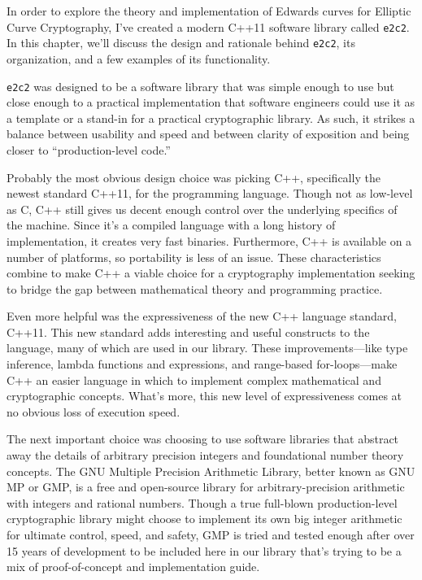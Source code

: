 \label{chp:e2c2}

In order to explore the theory and implementation of Edwards curves for
    Elliptic Curve Cryptography, I've created a modern C++11 software library
    called \texttt{e2c2}.
In this chapter, we'll discuss the design and rationale behind \texttt{e2c2},
    its organization, and a few examples of its functionality.



\texttt{e2c2} was designed to be a software library that was simple enough to
    use but close enough to a practical implementation that software engineers
    could use it as a template or a stand-in for a practical cryptographic
    library.
As such, it strikes a balance between usability and speed and between clarity
    of exposition and being closer to ``production-level code.''


Probably the most obvious design choice was picking C++, specifically the
    newest standard C++11, for the programming language.
Though not as low-level as C, C++ still gives us decent enough control over
    the underlying specifics of the machine.
Since it's a compiled language with a long history of implementation, it
    creates very fast binaries.
Furthermore, C++ is available on a number of platforms, so portability is less
    of an issue.
These characteristics combine to make C++ a viable choice for a cryptography
    implementation seeking to bridge the gap between mathematical theory and
    programming practice.

Even more helpful was the expressiveness of the new C++ language standard,
    C++11\cite{jtcsc22}.
This new standard adds interesting and useful constructs to the language, many
    of which are used in our library.
These improvements---like type inference, lambda functions and expressions, and
    range-based for-loops---make C++ an easier language in which to implement
    complex mathematical and cryptographic concepts.
What's more, this new level of expressiveness comes at no obvious loss of
    execution speed.


The next important choice was choosing to use software libraries that abstract
    away the details of arbitrary precision integers and foundational number
    theory concepts.
The GNU Multiple Precision Arithmetic Library, better known as GNU MP or GMP,
    is a free and open-source library for arbitrary-precision arithmetic with
    integers and rational numbers.\cite{granlund1996gnu}
Though a true full-blown production-level cryptographic library might choose to
    implement its own big integer arithmetic for ultimate control, speed, and
    safety, GMP is tried and tested enough after over 15 years of development
    to be included here in our library that's trying to be a mix of
    proof-of-concept and implementation guide.

